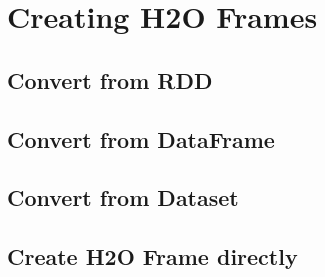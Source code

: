 \documentclass{standalone}
\begin{document}
	\section{Creating H2O Frames}

	\subsection{Convert from RDD}
	\subsection{Convert from DataFrame}
	\subsection{Convert from Dataset}
	\subsection{Create H2O Frame directly}
\end{document}
